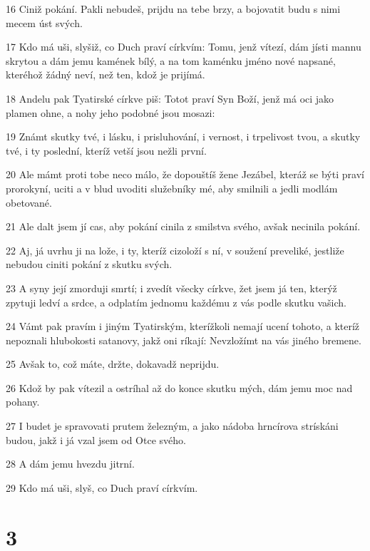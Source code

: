 \par 16 Ciniž pokání. Pakli nebudeš, prijdu na tebe brzy, a bojovatit budu s nimi mecem úst svých.
\par 17 Kdo má uši, slyšiž, co Duch praví církvím: Tomu, jenž vítezí, dám jísti mannu skrytou a dám jemu kamének bílý, a na tom kaménku jméno nové napsané, kteréhož žádný neví, než ten, kdož je prijímá.
\par 18 Andelu pak Tyatirské církve piš: Totot praví Syn Boží, jenž má oci jako plamen ohne, a nohy jeho podobné jsou mosazi:
\par 19 Známt skutky tvé, i lásku, i prisluhování, i vernost, i trpelivost tvou, a skutky tvé, i ty poslední, kteríž vetší jsou nežli první.
\par 20 Ale mámt proti tobe neco málo, že dopouštíš žene Jezábel, kteráž se býti praví prorokyní, uciti a v blud uvoditi služebníky mé, aby smilnili a jedli modlám obetované.
\par 21 Ale dalt jsem jí cas, aby pokání cinila z smilstva svého, avšak necinila pokání.
\par 22 Aj, já uvrhu ji na lože, i ty, kteríž cizoloží s ní, v soužení preveliké, jestliže nebudou ciniti pokání z skutku svých.
\par 23 A syny její zmorduji smrtí; i zvedít všecky církve, žet jsem já ten, kterýž zpytuji ledví a srdce, a odplatím jednomu každému z vás podle skutku vašich.
\par 24 Vámt pak pravím i jiným Tyatirským, kterížkoli nemají ucení tohoto, a kteríž nepoznali hlubokosti satanovy, jakž oni ríkají: Nevzložímt na vás jiného bremene.
\par 25 Avšak to, což máte, držte, dokavadž neprijdu.
\par 26 Kdož by pak vítezil a ostríhal až do konce skutku mých, dám jemu moc nad pohany.
\par 27 I budet je spravovati prutem železným, a jako nádoba hrncírova strískáni budou, jakž i já vzal jsem od Otce svého.
\par 28 A dám jemu hvezdu jitrní.
\par 29 Kdo má uši, slyš, co Duch praví církvím.

\chapter{3}


